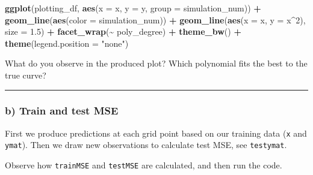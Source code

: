 \documentclass[
]{article}
\newenvironment{Shaded}{\begin{snugshade}}{\end{snugshade}}
\newcommand{\AttributeTok}[1]{\textcolor[rgb]{0.13,0.29,0.53}{#1}}
\newcommand{\DecValTok}[1]{\textcolor[rgb]{0.00,0.00,0.81}{#1}}
\newcommand{\FloatTok}[1]{\textcolor[rgb]{0.00,0.00,0.81}{#1}}
\newcommand{\FunctionTok}[1]{\textcolor[rgb]{0.13,0.29,0.53}{\textbf{#1}}}
\newcommand{\NormalTok}[1]{#1}
\newcommand{\SpecialCharTok}[1]{\textcolor[rgb]{0.81,0.36,0.00}{\textbf{#1}}}
\newcommand{\StringTok}[1]{\textcolor[rgb]{0.31,0.60,0.02}{#1}}
\begin{document}
\begin{Shaded}
\begin{Highlighting}[]
\FunctionTok{ggplot}\NormalTok{(plotting\_df, }\FunctionTok{aes}\NormalTok{(}\AttributeTok{x =}\NormalTok{ x, }\AttributeTok{y =}\NormalTok{ y, }\AttributeTok{group =}\NormalTok{ simulation\_num)) }\SpecialCharTok{+}
  \FunctionTok{geom\_line}\NormalTok{(}\FunctionTok{aes}\NormalTok{(}\AttributeTok{color =}\NormalTok{ simulation\_num)) }\SpecialCharTok{+}
  \FunctionTok{geom\_line}\NormalTok{(}\FunctionTok{aes}\NormalTok{(}\AttributeTok{x =}\NormalTok{ x, }\AttributeTok{y =}\NormalTok{ x}\SpecialCharTok{\^{}}\DecValTok{2}\NormalTok{), }\AttributeTok{size =} \FloatTok{1.5}\NormalTok{) }\SpecialCharTok{+}
  \FunctionTok{facet\_wrap}\NormalTok{(}\SpecialCharTok{\textasciitilde{}}\NormalTok{ poly\_degree) }\SpecialCharTok{+}
  \FunctionTok{theme\_bw}\NormalTok{() }\SpecialCharTok{+}
  \FunctionTok{theme}\NormalTok{(}\AttributeTok{legend.position =} \StringTok{"none"}\NormalTok{)}
\end{Highlighting}
\end{Shaded}

What do you observe in the produced plot? Which polynomial fits the best
to the true curve?

\begin{center}\rule{0.5\linewidth}{0.5pt}\end{center}

\subsubsection{b) Train and test MSE}\label{b-train-and-test-mse}

First we produce predictions at each grid point based on our training
data (\texttt{x} and \texttt{ymat}). Then we draw new observations to
calculate test MSE, see \texttt{testymat}.

Observe how \texttt{trainMSE} and \texttt{testMSE} are calculated, and
then run the code.
\end{document}
